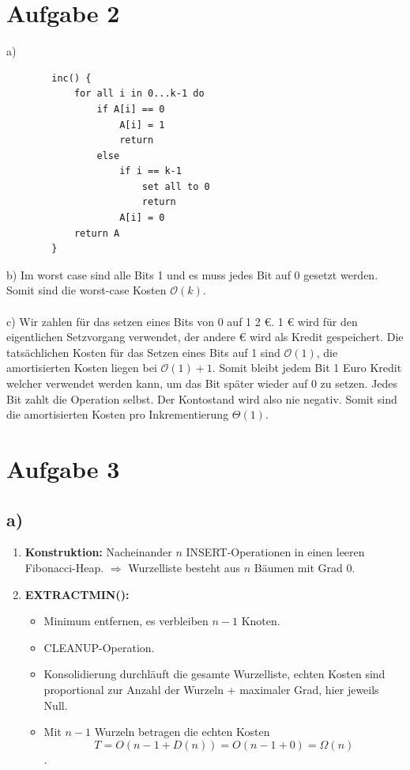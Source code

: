 \documentclass[a4paper]{scrartcl}
\def\Oh{\ensuremath{\mathcal{O}}} %
\begin{document}
\section*{Aufgabe 2}
    a)
    \begin{verbatim}
        inc() {
            for all i in 0...k-1 do
                if A[i] == 0
                    A[i] = 1
                    return
                else
                    if i == k-1
                        set all to 0
                        return
                    A[i] = 0
            return A
        }
    \end{verbatim}

    b) Im worst case sind alle Bits 1 und es muss jedes Bit auf 0 gesetzt werden. Somit sind die worst-case Kosten $\Oh(k)$.
\\\\
    c) Wir zahlen für das setzen eines Bits von 0 auf 1 2 €. 1 € wird für den eigentlichen Setzvorgang verwendet, der andere € wird als Kredit gespeichert. Die tatsächlichen Kosten für das Setzen eines Bits auf 1 sind $\Oh(1)$, die amortisierten Kosten liegen bei $\Oh(1)+1$. 
    Somit bleibt jedem Bit 1 Euro Kredit welcher verwendet werden kann, um das Bit später wieder auf 0 zu setzen. Jedes Bit zahlt die Operation selbst. Der Kontostand wird also nie negativ. Somit sind die amortisierten Kosten pro Inkrementierung $\Theta(1)$.

\section*{Aufgabe 3}

\subsection*{a)}

\begin{enumerate}
    \item \textbf{Konstruktion:} Nacheinander $n$ INSERT-Operationen in einen leeren Fibonacci-Heap. $\Rightarrow$ Wurzelliste besteht aus $n$ Bäumen mit Grad 0. 
    \item \textbf{EXTRACTMIN():}
    \begin{itemize}
        \item Minimum entfernen, es verbleiben $n-1$ Knoten.
        \item CLEANUP-Operation.
        \item Konsolidierung durchläuft die gesamte Wurzelliste, echten Kosten sind proportional zur Anzahl der Wurzeln + maximaler Grad, hier jeweils Null.
        \item Mit $n-1$ Wurzeln betragen die echten Kosten
        $$T = O(n - 1 + D(n)) = O(n - 1 + 0) = \Omega(n)$$.
    \end{itemize}
\end{enumerate}
\end{document}
